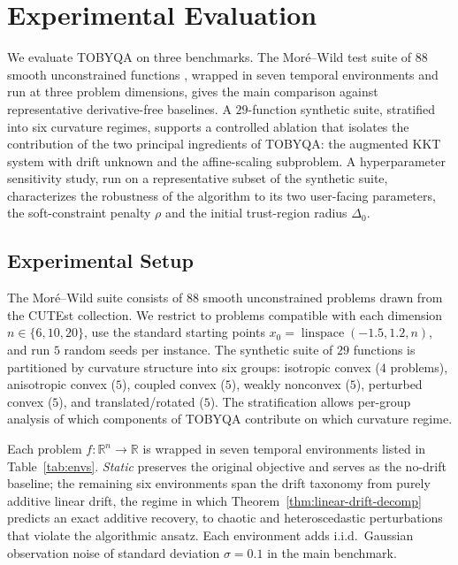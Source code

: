\documentclass[11pt,a4paper]{article}
\newcommand{\R}{\mathbb{R}}
\begin{document}
\section{Experimental Evaluation}
\label{sec:experiments}

We evaluate TOBYQA on three benchmarks. The Mor\'e--Wild test suite
of $88$ smooth unconstrained functions \cite{MoreWild2009},
wrapped in seven temporal environments and run at three problem
dimensions, gives the main comparison against representative
derivative-free baselines. A $29$-function synthetic suite,
stratified into six curvature regimes, supports a controlled
ablation that isolates the contribution of the two principal
ingredients of TOBYQA: the augmented KKT system with drift unknown
and the affine-scaling subproblem. A hyperparameter sensitivity
study, run on a representative subset of the synthetic suite,
characterizes the robustness of the algorithm to its two
user-facing parameters, the soft-constraint penalty $\rho$ and the
initial trust-region radius $\Delta_0$.

\subsection{Experimental Setup}
\label{sec:exp-setup}

The Mor\'e--Wild suite consists of $88$ smooth unconstrained
problems drawn from the CUTEst collection. We restrict to problems
compatible with each dimension $n \in \{6, 10, 20\}$, use the
standard starting points
$x_0 = \operatorname{linspace}(-1.5, 1.2, n)$, and run $5$ random
seeds per instance. The synthetic suite of $29$ functions is
partitioned by curvature structure into six groups: isotropic
convex ($4$ problems), anisotropic convex ($5$), coupled convex
($5$), weakly nonconvex ($5$), perturbed convex ($5$), and
translated/rotated ($5$). The stratification allows per-group
analysis of which components of TOBYQA contribute on which curvature
regime.

Each problem $f : \R^n \to \R$ is wrapped in seven temporal
environments listed in Table~\ref{tab:envs}. \emph{Static}
preserves the original objective and serves as the no-drift
baseline; the remaining six environments span the drift taxonomy
from purely additive linear drift, the regime in which
Theorem~\ref{thm:linear-drift-decomp} predicts an exact additive
recovery, to chaotic and heteroscedastic perturbations that
violate the algorithmic ansatz. Each environment adds i.i.d.\
Gaussian observation noise of standard deviation $\sigma = 0.1$ in
the main benchmark.
\end{document}
